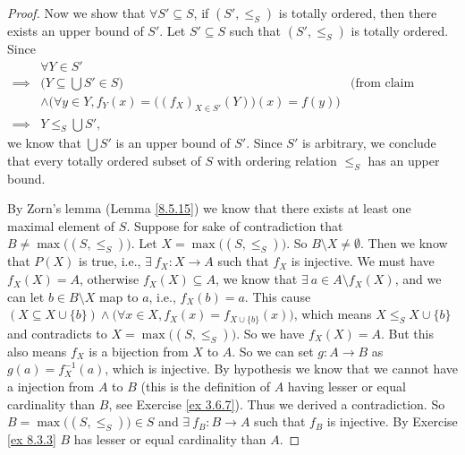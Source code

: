 \begin{proof}
    Now we show that \(\forall S' \subseteq S\), if \((S', \leq_S)\) is totally ordered, then there exists an upper bound of \(S'\).
    Let \(S' \subseteq S\) such that \((S', \leq_S)\) is totally ordered.
    Since
    \begin{align*}
                 & \forall Y \in S'                                                                                              \\
        \implies & \Big(Y \subseteq \bigcup S' \in S\Big)                                            & \text{(from claim above)} \\
                 & \land \Big(\forall y \in Y, f_Y(x) = \big((f_X)_{X \in S'}(Y)\big)(x) = f(y)\Big)                             \\
        \implies & Y \leq_S \bigcup S',
    \end{align*}
    we know that \(\bigcup S'\) is an upper bound of \(S'\).
    Since \(S'\) is arbitrary, we conclude that every totally ordered subset of \(S\) with ordering relation \(\leq_S\) has an upper bound.

    By Zorn's lemma (Lemma \ref{8.5.15}) we know that there exists at least one maximal element of \(S\).
    Suppose for sake of contradiction that \(B \neq \max\big((S, \leq_S)\big)\).
    Let \(X = \max\big((S, \leq_S)\big)\).
    So \(B \setminus X \neq \emptyset\).
    Then we know that \(P(X)\) is true, i.e., \(\exists\ f_X : X \to A\) such that \(f_X\) is injective.
    We must have \(f_X(X) = A\), otherwise \(f_X(X) \subseteq A\), we know that \(\exists\ a \in A \setminus f_X(X)\), and we can let \(b \in B \setminus X\) map to \(a\), i.e., \(f_X(b) = a\).
    This cause \((X \subseteq X \cup \{b\}) \land \big(\forall x \in X, f_X(x) = f_{X \cup \{b\}}(x)\big)\), which means \(X \leq_S X \cup \{b\}\) and contradicts to \(X = \max\big((S, \leq_S)\big)\).
    So we have \(f_X(X) = A\).
    But this also means \(f_X\) is a bijection from \(X\) to \(A\).
    So we can set \(g : A \to B\) as \(g(a) = f_X^{-1}(a)\), which is injective.
    By hypothesis we know that we cannot have a injection from \(A\) to \(B\) (this is the definition of \(A\) having lesser or equal cardinality than \(B\), see Exercise \ref{ex 3.6.7}).
    Thus we derived a contradiction.
    So \(B = \max\big((S, \leq_S)\big) \in S\) and \(\exists\ f_B : B \to A\) such that \(f_B\) is injective.
    By Exercise \ref{ex 8.3.3} \(B\) has lesser or equal cardinality than \(A\).
\end{proof}

